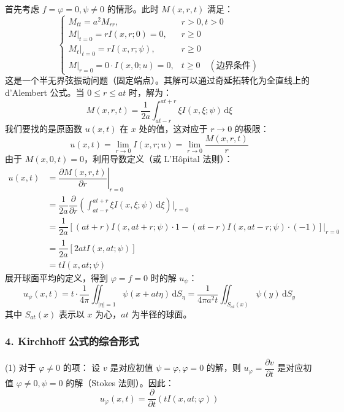 \documentclass[12pt,a4paper]{ctexart}
\begin{document}
	首先考虑 $f = \varphi = 0, \psi \neq 0$ 的情形。此时 $M(x,r,t)$ 满足：
	\begin{equation}
		\begin{cases}
			M_{tt} = a^2 M_{rr}, & r > 0, t > 0 \\
			M|_{t=0} = r I(x,r;0) = 0, & r \ge 0 \\
			M_t|_{t=0} = r I(x,r;\psi), & r \ge 0 \\
			M|_{r=0} = 0 \cdot I(x,0;u) = 0, & t \ge 0 \quad (\text{边界条件})
		\end{cases}
	\end{equation}
	这是一个半无界弦振动问题（固定端点）。其解可以通过奇延拓转化为全直线上的 d'Alembert 公式。当 $0 \le r \le at$ 时，解为：
	\begin{equation}
		M(x,r,t) = \dfrac{1}{2a} \int_{at-r}^{at+r} \xi I(x,\xi;\psi) \, \mathrm{d}\xi
		\label{eq:M_solution}
	\end{equation}
	我们要找的是原函数 $u(x,t)$ 在 $x$ 处的值，这对应于 $r \to 0$ 的极限：
	\[
	u(x,t) = \lim_{r \to 0} I(x,r;u) = \lim_{r \to 0} \dfrac{M(x,r,t)}{r}
	\]
	由于 $M(x,0,t)=0$，利用导数定义（或 L'H\^{o}pital 法则）：
	\begin{align*}
		u(x,t) &= \left. \dfrac{\partial M(x,r,t)}{\partial r} \right|_{r=0} \\
		&= \dfrac{1}{2a} \dfrac{\partial}{\partial r} \left( \int_{at-r}^{at+r} \xi I(x,\xi;\psi) \, \mathrm{d}\xi \right) \bigg|_{r=0} \\
		&= \dfrac{1}{2a} \left[ (at+r)I(x,at+r;\psi) \cdot 1 - (at-r)I(x,at-r;\psi) \cdot (-1) \right] \bigg|_{r=0} \\
		&= \dfrac{1}{2a} \left[ 2at I(x,at;\psi) \right] \\
		&= t I(x,at;\psi)
	\end{align*}
	展开球面平均的定义，得到 $\varphi=f=0$ 时的解 $u_\psi$：
	\begin{equation}
		u_\psi(x,t) = t \cdot \dfrac{1}{4\pi} \iint_{|\eta|=1} \psi(x+at\eta) \, \mathrm{d}S_\eta = \dfrac{1}{4\pi a^2 t} \iint_{S_{at}(x)} \psi(y) \, \mathrm{d}S_y
	\end{equation}
	其中 $S_{at}(x)$ 表示以 $x$ 为心，$at$ 为半径的球面。
	
	\subsubsection*{4. Kirchhoff 公式的综合形式}
	
	(1) 对于 $\varphi \neq 0$ 的项：
	设 $v$ 是对应初值 $\psi=\varphi, \varphi=0$ 的解，则 $u_\varphi = \dfrac{\partial v}{\partial t}$ 是对应初值 $\varphi \neq 0, \psi=0$ 的解（Stokes 法则）。因此：
	\[
	u_\varphi(x,t) = \dfrac{\partial}{\partial t} \left( t I(x,at;\varphi) \right)
	\]
	
\end{document}
